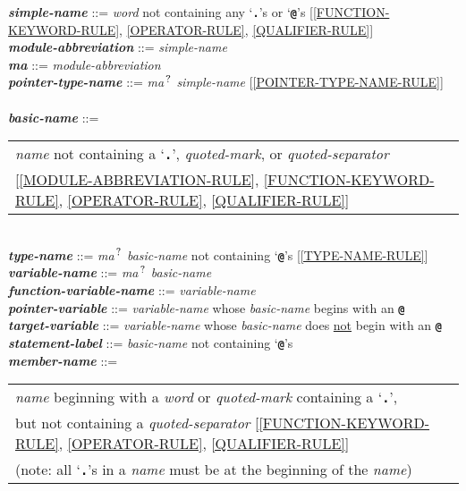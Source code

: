 \documentclass[12pt]{article}
\newcommand{\TT}[1]{{\tt \bfseries #1}}
\newcommand{\QMARK}{{$^{\,\mbox{\footnotesize ?}}$}}
\newcommand{\MA}{{\em ma}\QMARK}
\newcommand{\emkey}[1]{{\em \bfseries #1}}
\newenvironment{indpar}[1][0.3in]%
	{\begin{list}{}%
		     {\setlength{\itemsep}{0in}%
		      \setlength{\topsep}{0in}%
		      \setlength{\parsep}{1ex}%
		      \setlength{\labelwidth}{#1}%
		      \setlength{\leftmargin}{#1}%
		      \addtolength{\leftmargin}{\labelsep}}%
	 \item}%
	{\end{list}}
\begin{document}
\begin{indpar}
\emkey{simple-name} ::= {\em word} not containing any `\TT{.}'s or `\TT{@}'s
    [\ref{FUNCTION-KEYWORD-RULE},
     \ref{OPERATOR-RULE},
     \ref{QUALIFIER-RULE}] \\
\emkey{module-abbreviation}\label{MODULE-ABBREVIATION} ::= {\em simple-name} \\
\emkey{ma} ::= {\em module-abbreviation} \\
\emkey{pointer-type-name}\label{POINTER-TYPE-NAME} ::=
    \MA{} {\em simple-name}
    [\ref{POINTER-TYPE-NAME-RULE}] \\
\\[1ex]
\emkey{basic-name}\label{BASIC-NAME} ::=
	\begin{tabular}[t]{@{}l}
	{\em name} not containing a `\TT{.}', {\em quoted-mark}, or
	    {\em quoted-separator} \\{}
	[\ref{MODULE-ABBREVIATION-RULE},
	 \ref{FUNCTION-KEYWORD-RULE},
	 \ref{OPERATOR-RULE},
	 \ref{QUALIFIER-RULE}] \\
	\end{tabular} \\
\emkey{type-name}\label{TYPE-NAME} ::=
    \MA{} {\em basic-name} not containing `\TT{@}'s
	[\ref{TYPE-NAME-RULE}] \\
\emkey{variable-name}\label{VARIABLE-NAME} ::=
    \MA{} {\em basic-name} \\
\emkey{function-variable-name}\label{FUNCTION-VARIABLE-NAME} ::=
    {\em variable-name} \\
\emkey{pointer-variable}\label{POINTER-VARIABLE} ::=
    {\em variable-name} whose {\em basic-name} begins with an \TT{@} \\
\emkey{target-variable}\label{TARGET-VARIABLE} ::=
    {\em variable-name} whose {\em basic-name} does \underline{not}
    begin with an \TT{@} \\
\emkey{statement-label} ::= {\em basic-name}
    \label{STATEMENT-LABEL} not containing `\TT{@}'s
\\[1ex]
\emkey{member-name}\label{MEMBER-NAME}
	::= \begin{tabular}[t]{@{}l@{}}
                        {\em name} beginning with a {\em word} or
			{\em quoted-mark} containing a `\TT{.}', \\
			but not containing a {\em quoted-separator}
			[\ref{FUNCTION-KEYWORD-RULE},
			 \ref{OPERATOR-RULE},
			 \ref{QUALIFIER-RULE}] \\
			(note: all `\TT{.}'s in a {\em name} must be at
			 the beginning of the {\em name})

\end{tabular}
\end{indpar}
\end{document}
